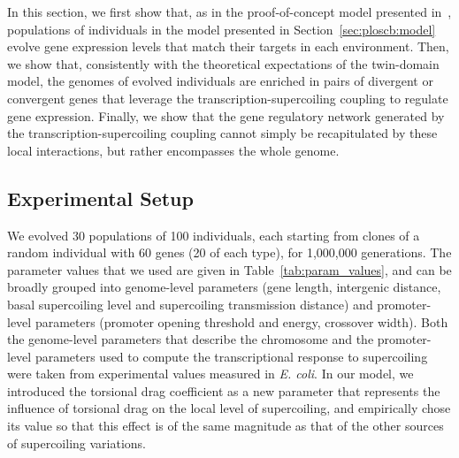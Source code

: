 In this section, we first show that, as in the proof-of-concept model presented in~\citep{grohens2021}, populations of individuals in the model presented in Section~\ref{sec:ploscb:model} evolve gene expression levels that match their targets in each environment.
Then, we show that, consistently with the theoretical expectations of the twin-domain model, the genomes of evolved individuals are enriched in pairs of divergent or convergent genes that leverage the transcription-supercoiling coupling to regulate gene expression.
Finally, we show that the gene regulatory network generated by the transcription-supercoiling coupling cannot simply be recapitulated by these local interactions, but rather encompasses the whole genome.

\subsection{Experimental Setup}

We evolved 30 populations of 100 individuals, each starting from clones of a random individual with 60 genes (20 of each type), for 1,000,000 generations.
The parameter values that we used are given in Table~\ref{tab:param_values}, and can be broadly grouped into genome-level parameters (gene length, intergenic distance, basal supercoiling level and supercoiling transmission distance) and promoter-level parameters (promoter opening threshold and energy, crossover width).
Both the genome-level parameters that describe the chromosome and the promoter-level parameters used to compute the transcriptional response to supercoiling were taken from experimental values measured in \emph{E. coli}.
In our model, we introduced the torsional drag coefficient as a new parameter that represents the influence of torsional drag on the local level of supercoiling, and empirically chose its value so that this effect is of the same magnitude as that of the other sources of supercoiling variations.

